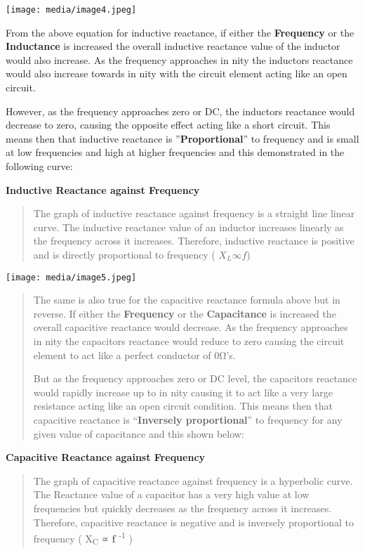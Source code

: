 \documentclass[]{article}
\begin{document}
\texttt{[image: media/image4.jpeg]}

From the above equation for inductive reactance, if either the
\textbf{Frequency} or the \textbf{Inductance} is increased the overall
inductive reactance value of the inductor would also increase. As the
frequency approaches in nity the inductors reactance would also increase
towards in nity with the circuit element acting like an open circuit.

However, as the frequency approaches zero or DC, the inductors reactance
would decrease to zero, causing the opposite effect acting like a short
circuit. This means then that inductive reactance is
''\textbf{Proportional}'' to frequency and is small at low frequencies
and high at higher frequencies and this demonstrated in the following
curve:

\textbf{Inductive Reactance against Frequency}

\begin{quote}
The graph of inductive reactance against frequency is a straight line
linear curve. The inductive reactance value of an inductor increases
linearly as the frequency across it increases. Therefore, inductive
reactance is positive and is directly proportional to frequency (
$X_L \infty f$)
\end{quote}

\texttt{[image: media/image5.jpeg]}

\begin{quote}
The same is also true for the capacitive reactance formula above but in
reverse. If either the \textbf{Frequency} or the \textbf{Capacitance} is
increased the overall capacitive reactance would decrease. As the
frequency approaches in nity the capacitors reactance would reduce to
zero causing the circuit element to act like a perfect conductor of
0Ω's.

But as the frequency approaches zero or DC level, the capacitors
reactance would rapidly increase up to in nity causing it to act like a
very large resistance acting like an open circuit condition. This means
then that capacitive reactance is ``\textbf{Inversely proportional}'' to
frequency for any given value of capacitance and this shown below:
\end{quote}

\textbf{Capacitive Reactance against Frequency}

\begin{quote}
The graph of capacitive reactance against frequency is a hyperbolic
curve. The Reactance value of a capacitor has a very high value at low
frequencies but quickly decreases as the frequency across it increases.
Therefore, capacitive reactance is negative and is inversely
proportional to frequency ( X\textsubscript{C} ∝ \textbf{ƒ}
\textsuperscript{-1} )
\end{quote}
\end{document}
